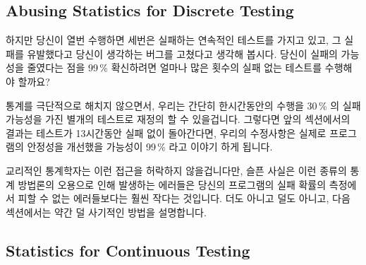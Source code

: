 \subsection{Abusing Statistics for Discrete Testing}
\label{sec:debugging:Abusing Statistics for Discrete Testing}

하지만 당신이 열번 수행하면 세번은 실패하는 연속적인 테스트를 가지고 있고, 그
실패를 유발했다고 당신이 생각하는 버그를 고쳤다고 생각해 봅시다.
당신이 실패의 가능성을 줄였다는 점을 99\,\% 확신하려면 얼마나 많은 횟수의 실패
없는 테스트를 수행해야 할까요?

통계를 극단적으로 해치지 않으면서, 우리는 간단히 한시간동안의 수행을 30\,\% 의
실패 가능성을 가진 별개의 테스트로 재정의 할 수 있을겁니다.
그렇다면 앞의 섹션에서의 결과는 테스트가 13시간동안 실패 없이 돌아간다면,
우리의 수정사항은 실제로 프로그램의 안정성을 개선했을 가능성이 99\,\% 라고 이야기
하게 됩니다.

교리적인 통계학자는 이런 접근을 허락하지 않을겁니다만, 슬픈 사실은 이런 종류의
통계 방법론의 오용으로 인해 발생하는 에러들은 당신의 프로그램의 실패 확률의
측정에서 피할 수 없는 에러들보다는 훨씬 작다는 것입니다.
더도 아니고 덜도 아니고, 다음 섹션에서는 약간 덜 사기적인 방법을 설명합니다.

\subsection{Statistics for Continuous Testing}
\label{sec:debuggingStatistics for Continuous Testing}

